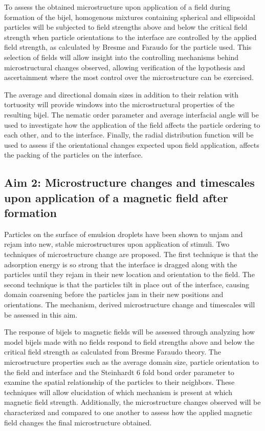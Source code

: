 To assess the obtained microstructure upon application of a field during formation of the bijel, homogenous mixtures containing spherical and ellipsoidal particles will be subjected to field strengths above and below the critical field strength when particle orientations to the interface are controlled by the applied field strength, as calculated by Bresme and Faraudo for the particle used. This selection of fields will allow insight into the controlling mechanisms behind microstructural changes observed, allowing verification of the hypothesis and ascertainment where the most control over the microstructure can be exercised.

The average and directional domain sizes in addition to their relation with tortuosity will provide windows into the microstructural properties of the resulting bijel. The nematic order parameter and average interfacial angle will be used to investigate how the application of the field affects the particle ordering to each other, and to the interface. Finally, the radial distribution function will be used to assess if the orientational changes expected upon field application, affects the packing of the particles on the interface.

\subsection{Aim 2: Microstructure changes and timescales upon application of a magnetic field after formation}
\label{section:aim2_desc}

Particles on the surface of emulsion droplets have been shown to unjam and rejam into new, stable microstructures upon application of stimuli. \cite{cui_stabilizing_2013} Two techniques of microstructure change are proposed. The first technique is that the adsorption energy is so strong that the interface is dragged along with the particles until they rejam in their new location and orientation to the field. The second technique is that the particles tilt in place out of the interface, causing domain coarsening before the particles jam in their new positions and orientations. The mechanism, derived microstructure change and timescales will be assessed in this aim.

The response of bijels to magnetic fields will be assessed through analyzing how model bijels made with no fields respond to field strengths above and below the critical field strength as calculated from Bresme Faraudo theory. The microstructure properties such as the average domain size, particle orientation to the field and interface and the Steinhardt 6 fold bond order parameter to examine the spatial relationship of the particles to their neighbors. These techniques will allow elucidation of which mechanism is present at which magnetic field strength. Additionally, the microstructure changes observed will be characterized and compared to one another to assess how the applied magnetic field changes the final microstructure obtained. 

